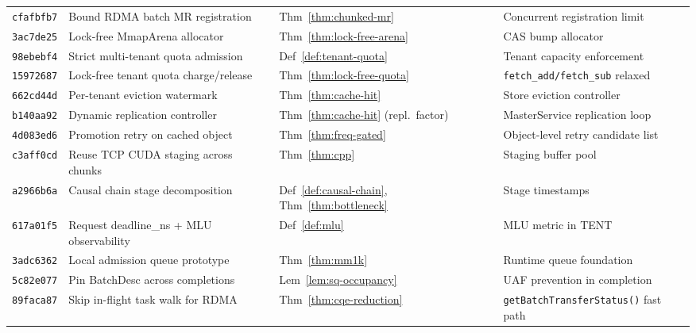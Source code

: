 \documentclass[11pt,a4paper,twoside]{article}
\theoremstyle{plain}
\theoremstyle{definition}
\theoremstyle{remark}
\begin{document}
\begin{small}
\begin{longtable}{p{1.6cm}p{4.5cm}p{2.5cm}p{4.5cm}}
\texttt{cfafbfb7} & Bound RDMA batch MR registration &
  Thm~\ref{thm:chunked-mr} &
  Concurrent registration limit \\

\texttt{3ac7de25} & Lock-free MmapArena allocator &
  Thm~\ref{thm:lock-free-arena} &
  CAS bump allocator \\

\texttt{98ebebf4} & Strict multi-tenant quota admission &
  Def~\ref{def:tenant-quota} &
  Tenant capacity enforcement \\

\texttt{15972687} & Lock-free tenant quota charge/release &
  Thm~\ref{thm:lock-free-quota} &
  \texttt{fetch\_add/fetch\_sub} relaxed \\

\texttt{662cd44d} & Per-tenant eviction watermark &
  Thm~\ref{thm:cache-hit} &
  Store eviction controller \\

\texttt{b140aa92} & Dynamic replication controller &
  Thm~\ref{thm:cache-hit} (repl.\ factor) &
  MasterService replication loop \\

\texttt{4d083ed6} & Promotion retry on cached object &
  Thm~\ref{thm:freq-gated} &
  Object-level retry candidate list \\

\texttt{c3aff0cd} & Reuse TCP CUDA staging across chunks &
  Thm~\ref{thm:cpp} &
  Staging buffer pool \\

\texttt{a2966b6a} & Causal chain stage decomposition &
  Def~\ref{def:causal-chain}, Thm~\ref{thm:bottleneck} &
  Stage timestamps \\

\texttt{617a01f5} & Request deadline\_ns + MLU observability &
  Def~\ref{def:mlu} &
  MLU metric in TENT \\

\texttt{3adc6362} & Local admission queue prototype &
  Thm~\ref{thm:mm1k} &
  Runtime queue foundation \\

\texttt{5c82e077} & Pin BatchDesc across completions &
  Lem~\ref{lem:sq-occupancy} &
  UAF prevention in completion \\

\texttt{89faca87} & Skip in-flight task walk for RDMA &
  Thm~\ref{thm:cqe-reduction} &
  \texttt{getBatchTransferStatus()} fast path \\


\end{longtable}
\end{small}
\end{document}
